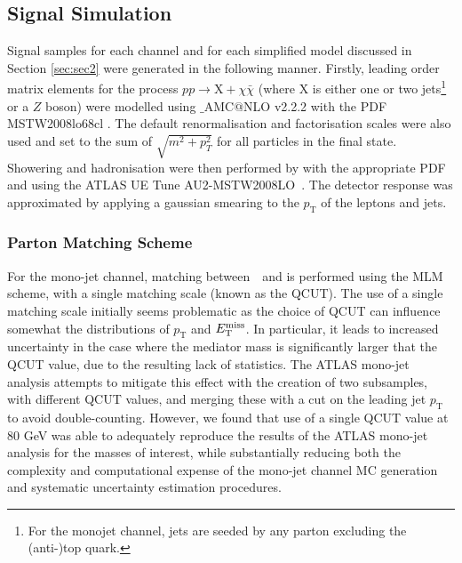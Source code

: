 \subsection{Signal Simulation}
\label{signal_generation}
Signal samples for each channel and for each simplified model discussed in Section \ref{sec:sec2} were generated in the following manner. Firstly, leading order matrix elements for the process $pp \rightarrow \mathrm{X} + \chi\bar{\chi}$ (where X is either one or two jets\footnote{For the monojet channel, jets are seeded by any parton excluding the (anti-)top quark.} or a $Z$ boson) were modelled using \MG$\_${\footnotesize A}MC$@$NLO v2.2.2 \cite{MG_aMCNLO2014} with the PDF MSTW2008lo68cl \cite{MSTW}. The default renormalisation and factorisation scales were also used and set to the sum of $\sqrt{m^{2} + p_{T}^{2}}$ for all particles in the final state. Showering and hadronisation were then performed by  with the appropriate PDF and using the ATLAS UE Tune AU2-MSTW2008LO~\cite{AUtune}. The detector response was approximated by applying a gaussian smearing to the $p_{\mathrm{T}}$ of the leptons and jets.

\subsubsection{Parton Matching Scheme}
\label{matching_procedure}
For the mono-jet channel, matching between \MG$\mbox{ }$and \PYTHIA is performed using the MLM scheme, with a single matching scale (known as the QCUT). The use of a single matching scale initially seems problematic as the choice of QCUT can influence somewhat the distributions of $p_{\mathrm{T}}$ and $E_{\mathrm{T}}^{\mathrm{miss}}$. In particular, it leads to increased uncertainty in the case where the mediator mass is significantly larger that the QCUT value, due to the resulting lack of statistics. The ATLAS mono-jet analysis attempts to mitigate this effect with the creation of two subsamples, with different QCUT values, and merging these with a cut on the leading jet $p_{\mathrm{T}}$ to avoid double-counting. However, we found that use of a single QCUT value at 80 GeV was able to adequately reproduce the results of the ATLAS mono-jet analysis for the masses of interest, while substantially reducing both the complexity and computational expense of the mono-jet channel MC generation and systematic uncertainty estimation procedures. 

